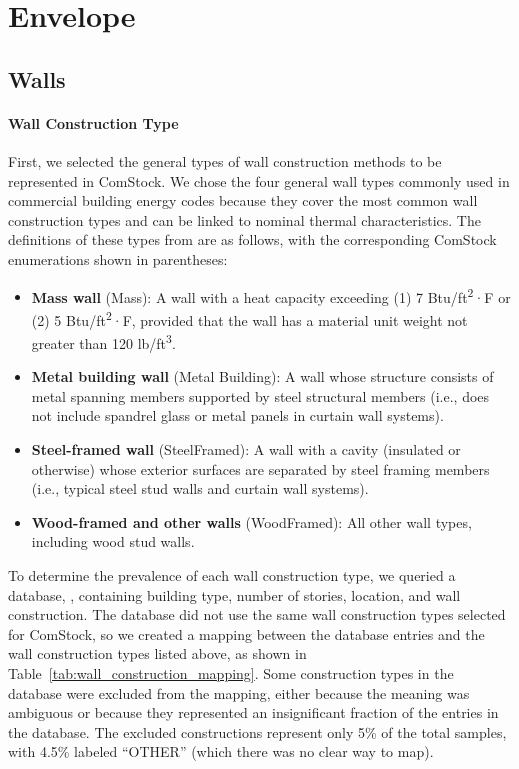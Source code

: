 \section{Envelope}
\subsection{Walls} %
\paragraph{Wall Construction Type}
First, we selected the general types of wall construction methods to be represented in ComStock. We chose the four general wall types commonly used in commercial building energy codes because they cover the most common wall construction types and can be linked to nominal thermal characteristics. The definitions of these types from \cite{ashrae_901_2010} are as follows, with the corresponding ComStock enumerations shown in parentheses:

\begin{itemize}
\item \textbf{Mass wall} (Mass): A wall with a heat capacity exceeding (1) 7 Btu/ft\textsuperscript{2}·F or (2) 5 Btu/ft\textsuperscript{2}·F, provided that the wall has a material unit weight not greater than 120 lb/ft\textsuperscript{3}.
\item \textbf{Metal building wall} (Metal Building): A wall whose structure consists of metal spanning members supported by steel structural members (i.e., does not include spandrel glass or metal panels in curtain wall systems).
\item \textbf{Steel-framed wall} (SteelFramed): A wall with a cavity (insulated or otherwise) whose exterior surfaces are separated by steel  framing members (i.e., typical steel stud walls and curtain wall systems).
\item \textbf{Wood-framed and other walls} (WoodFramed): All other wall types, including wood stud walls.
\end{itemize}

To determine the prevalence of each wall construction type, we queried a database, \cite{lightbox_smartparcels_2021}, containing  building type, number of stories, location, and wall construction. The database did not use the same wall construction types selected for ComStock, so we created a mapping between the database entries and the wall construction types listed above, as shown in Table~\ref{tab:wall_construction_mapping}. Some construction types in the database were excluded from the mapping, either because the meaning was ambiguous or because they represented an insignificant fraction of the entries in the database. The excluded constructions represent only 5\% of the total samples, with 4.5\% labeled “OTHER” (which there was no clear way to map).

